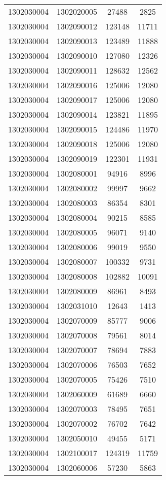 \begin{longtable}[h]{llcc}
		1302030004 & 1302020005 & 27488 & 2825\\
		1302030004 & 1302090012 & 123148 & 11711\\
		1302030004 & 1302090013 & 123489 & 11888\\
		1302030004 & 1302090010 & 127080 & 12326\\
		1302030004 & 1302090011 & 128632 & 12562\\
		1302030004 & 1302090016 & 125006 & 12080\\
		1302030004 & 1302090017 & 125006 & 12080\\
		1302030004 & 1302090014 & 123821 & 11895\\
		1302030004 & 1302090015 & 124486 & 11970\\
		1302030004 & 1302090018 & 125006 & 12080\\
		1302030004 & 1302090019 & 122301 & 11931\\
		1302030004 & 1302080001 & 94916 & 8996\\
		1302030004 & 1302080002 & 99997 & 9662\\
		1302030004 & 1302080003 & 86354 & 8301\\
		1302030004 & 1302080004 & 90215 & 8585\\
		1302030004 & 1302080005 & 96071 & 9140\\
		1302030004 & 1302080006 & 99019 & 9550\\
		1302030004 & 1302080007 & 100332 & 9731\\
		1302030004 & 1302080008 & 102882 & 10091\\
		1302030004 & 1302080009 & 86961 & 8493\\
		1302030004 & 1302031010 & 12643 & 1413\\
		1302030004 & 1302070009 & 85777 & 9006\\
		1302030004 & 1302070008 & 79561 & 8014\\
		1302030004 & 1302070007 & 78694 & 7883\\
		1302030004 & 1302070006 & 76503 & 7652\\
		1302030004 & 1302070005 & 75426 & 7510\\
		1302030004 & 1302060009 & 61689 & 6660\\
		1302030004 & 1302070003 & 78495 & 7651\\
		1302030004 & 1302070002 & 76702 & 7642\\
		1302030004 & 1302050010 & 49455 & 5171\\
		1302030004 & 1302100017 & 124319 & 11759\\
		1302030004 & 1302060006 & 57230 & 5863\\

\end{longtable}
